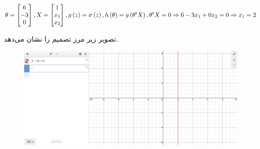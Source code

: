 \documentclass{article}
\begin{document}
\section{}%
\subsection{}
\begin{latin}
$
\theta = \begin{bmatrix}
6 \\
-3\\
0
\end{bmatrix}, \\
X = \begin{bmatrix}
1 \\
x_1\\
x_2
\end{bmatrix}, \\
g\left( z \right) = \sigma \left( z \right), \\
h\left( \theta \right) = g\left( \theta ^ t X \right),\\
\theta ^ t X = 0 \Rightarrow \\
6 - 3x_1 + 0x_2 = 0 \Rightarrow \\
x_1 = 2
$
\end{latin}
تصویر زیر مرز تصمیم را نشان می‌دهد.
\begin{figure}[H]
    \centering
    \includegraphics[width=1\textwidth]{figures/5.1.jpg}
    \caption
	{}
    \label{fig:fig1}
\end{figure}
\end{document}
